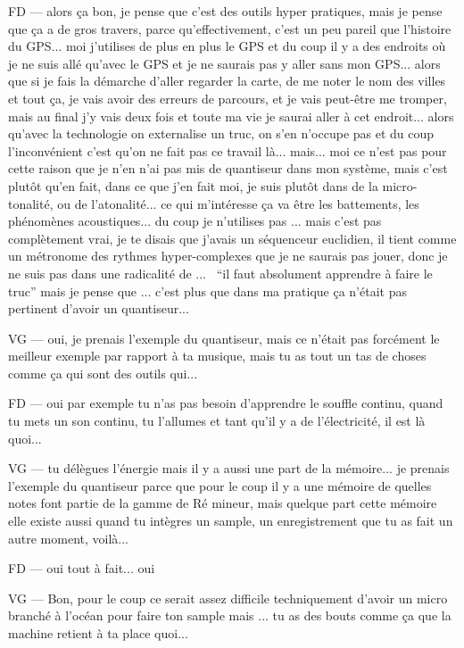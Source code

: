 FD — alors ça bon, je pense que c'est des outils hyper pratiques, mais je pense que ça a de gros travers, parce qu'effectivement, c'est un peu pareil que l'histoire du GPS... moi j'utilises de plus en plus le GPS et du coup il y a des endroits où je ne suis allé qu'avec le GPS et je ne saurais pas y aller sans mon GPS... alors que si je fais la démarche d'aller regarder la carte, de me noter le nom des villes et tout ça, je vais avoir des erreurs de parcours, et je vais peut-être me tromper, mais au final j'y vais deux fois et toute ma vie je saurai aller à cet endroit... alors qu'avec la technologie on externalise un truc, on s'en n'occupe pas et du coup l'inconvénient c'est qu'on ne fait pas ce travail là... mais... moi ce n'est pas pour cette raison que je n'en n'ai pas mis de quantiseur dans mon système, mais c'est plutôt qu'en fait, dans ce que j'en fait moi, je suis plutôt dans de la micro-tonalité, ou de l'atonalité... ce qui m'intéresse ça va être les battements, les phénomènes acoustiques... du coup je n'utilises pas ... mais c'est pas complètement vrai, je te disais que j'avais un séquenceur euclidien, il tient comme un métronome des rythmes hyper-complexes que je ne saurais pas jouer, donc je ne suis pas dans une radicalité de ...  ``il faut absolument apprendre à faire le truc'' mais je pense que ... c'est plus que dans ma pratique ça n'était pas pertinent d'avoir un quantiseur... 

VG — oui, je prenais l'exemple du quantiseur, mais ce n'était pas forcément le meilleur exemple par rapport à ta musique, mais tu as tout un tas de choses comme ça qui sont des outils qui... 

FD — oui par exemple tu n'as pas besoin d'apprendre le souffle continu, quand tu mets un son continu, tu l'allumes et tant qu'il y a de l'électricité, il est là quoi... 

VG — tu délègues l'énergie mais il y a aussi une part de la mémoire... je prenais l'exemple du quantiseur parce que pour le coup il y a une mémoire de quelles notes font partie de la gamme de Ré mineur, mais quelque part cette mémoire elle existe aussi quand tu intègres un sample, un enregistrement que tu as fait un autre moment, voilà... 

FD — oui tout à fait... oui 

VG — Bon, pour le coup ce serait assez difficile techniquement d'avoir un micro branché à l'océan pour faire ton sample mais ... tu as des bouts comme ça que la machine retient à ta place quoi... 

